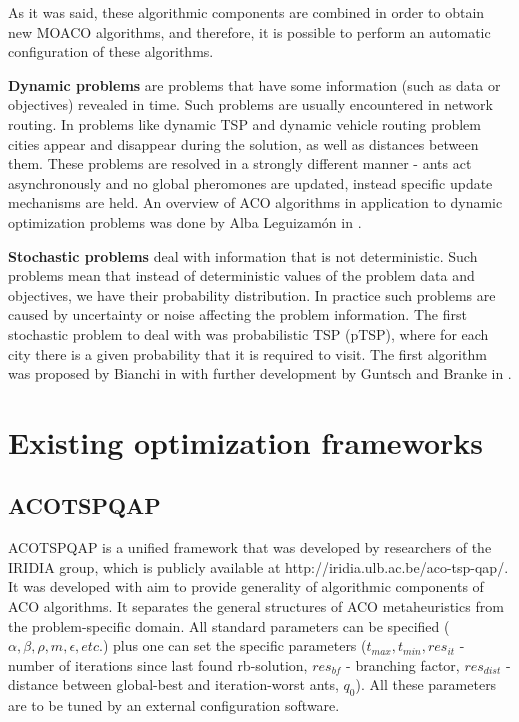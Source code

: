 \documentclass[12pt]{article}
\begin{document}
As it was said, these algorithmic components are combined in order to obtain new MOACO algorithms, and therefore, it is possible to perform an automatic configuration of these algorithms.


\textbf{Dynamic problems} are problems that have some information (such as data or objectives) revealed in time. Such problems are usually encountered in network routing. In problems like dynamic TSP and dynamic vehicle routing problem cities appear and disappear during the solution, as well as distances between them. These problems are resolved in a strongly different manner - ants act asynchronously and no global pheromones are updated, instead specific update mechanisms are held. An overview of ACO algorithms in application to dynamic optimization problems was done by Alba Leguizam{\'o}n in \cite{dynamic_overview}.

\textbf{Stochastic problems} deal with information that is not deterministic. Such problems mean that instead of deterministic values of the problem data and objectives, we have their probability distribution. In practice such problems are caused by uncertainty or noise affecting the problem information. The first stochastic problem to deal with was probabilistic TSP (pTSP), where for each city there is a given probability that it is required to visit. The first algorithm was proposed by Bianchi in \cite{bianchi_stochastic_tsp} with further development by Guntsch and Branke in \cite{guntsch_stochastic}.






\section{Existing optimization frameworks}

\subsection{ACOTSPQAP}

ACOTSPQAP is a unified framework that was developed by researchers of the IRIDIA group, which is publicly available at http://iridia.ulb.ac.be/aco-tsp-qap/. It was developed with aim to provide generality of algorithmic components of ACO algorithms. It separates the general structures of ACO metaheuristics from the problem-specific domain. All standard parameters can be specified ($\alpha, \beta, \rho, m, \epsilon, etc.$) plus one can set the specific parameters ($t_{max}, t_{min}, res_{it}$ - number of iterations since last found rb-solution, $res_{bf}$ - branching factor, $res_{dist}$ - distance between global-best and iteration-worst ants, $q_0$). All these parameters are to be tuned by an external configuration software.
\end{document}
